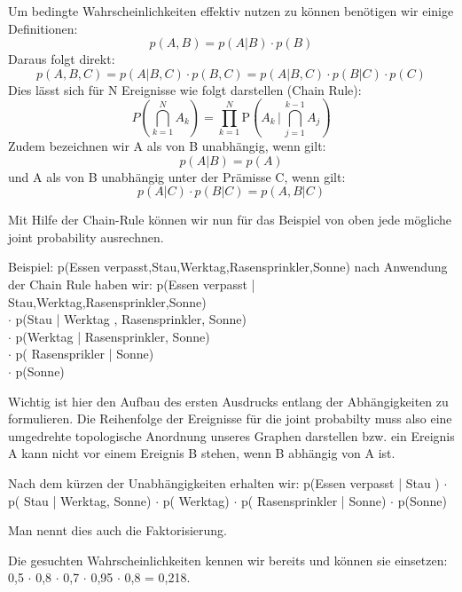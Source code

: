 Um bedingte Wahrscheinlichkeiten effektiv nutzen zu können benötigen wir einige Definitionen:
\begin{equation*}
p(A,B) = p (A | B) \cdot p (B)
\end{equation*}
Daraus folgt direkt:
\begin{equation*}
p(A,B,C) = p(A | B,C) \cdot p(B,C) = p(A | B,C) \cdot p(B | C) \cdot p(C)
\end{equation*}
Dies lässt sich für N Ereignisse wie folgt darstellen (Chain Rule):
\begin{equation*}
    P\left(\bigcap_{k=1}^N A_k\right)  = \prod_{k=1}^N  \mathrm P\left(A_k \,\Bigg|\, \bigcap_{j=1}^{k-1} A_j\right)
\end{equation*}
Zudem bezeichnen wir A als von B unabhängig, wenn gilt:
\begin{equation*}
p(A | B) = p(A)
\end{equation*}
und A als von B unabhängig unter der Prämisse C, wenn gilt:
\begin{equation*}
p(A | C) \cdot p(B | C) = p(A,B | C)
\end{equation*}

Mit Hilfe der Chain-Rule können wir nun für das Beispiel von oben jede mögliche joint probability ausrechnen.

Beispiel:
p(Essen verpasst,Stau,Werktag,Rasensprinkler,Sonne)
nach Anwendung der Chain Rule haben wir:
p(Essen verpasst | Stau,Werktag,Rasensprinkler,Sonne) \\ $\cdot$ p(Stau | Werktag , Rasensprinkler, Sonne) \\ $\cdot$ p(Werktag | Rasensprinkler, Sonne)
\\ $\cdot$ p( Rasensprikler | Sonne)
\\ $\cdot$ p(Sonne)

Wichtig ist hier den Aufbau des ersten Ausdrucks entlang der Abhängigkeiten zu formulieren. Die Reihenfolge der Ereignisse für die joint probabilty muss also eine umgedrehte topologische Anordnung unseres Graphen darstellen bzw. ein Ereignis A kann nicht vor einem Ereignis B stehen, wenn B abhängig von A ist.

Nach dem kürzen der Unabhängigkeiten erhalten wir:
p(Essen verpasst | Stau ) $\cdot$ p( Stau | Werktag, Sonne) $\cdot$ p( Werktag) $\cdot$ p( Rasensprinkler | Sonne) $\cdot$ p(Sonne)

Man nennt dies auch die Faktorisierung.

Die gesuchten Wahrscheinlichkeiten kennen wir bereits und können sie einsetzen:
0,5 $\cdot$ 0,8 $\cdot$ 0,7 $\cdot$ 0,95 $\cdot$ 0,8 = 0,218.

